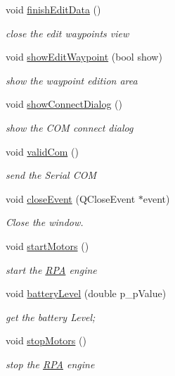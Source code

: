 \begin{DoxyCompactItemize}
void \hyperlink{class_m_a_r_c_s_afac390567e59b6ffb1a85ed8d10eb72d}{finish\-Edit\-Data} ()
\begin{DoxyCompactList}\small\item\em close the edit waypoints view \end{DoxyCompactList}\item 
void \hyperlink{class_m_a_r_c_s_af9305eb01a0389368c2a5c2ad58364ba}{show\-Edit\-Waypoint} (bool show)
\begin{DoxyCompactList}\small\item\em show the waypoint edition area \end{DoxyCompactList}\item 
void \hyperlink{class_m_a_r_c_s_a1daa288fdd9aac7708a6f19b284a1661}{show\-Connect\-Dialog} ()
\begin{DoxyCompactList}\small\item\em show the C\-O\-M connect dialog \end{DoxyCompactList}\item 
void \hyperlink{class_m_a_r_c_s_a1e9457e3289012e44b5bddf70f743468}{valid\-Com} ()
\begin{DoxyCompactList}\small\item\em send the Serial C\-O\-M \end{DoxyCompactList}\item 
void \hyperlink{class_m_a_r_c_s_aa5eb4375679c4532a015c9a067b0ab52}{close\-Event} (Q\-Close\-Event $\ast$event)
\begin{DoxyCompactList}\small\item\em Close the window. \end{DoxyCompactList}\item 
void \hyperlink{class_m_a_r_c_s_afefb7441273180bd38b7cf099a29b7da}{start\-Motors} ()
\begin{DoxyCompactList}\small\item\em start the \hyperlink{class_r_p_a}{R\-P\-A} engine \end{DoxyCompactList}\item 
void \hyperlink{class_m_a_r_c_s_ae868565ddb2f8652d3867cf54b13376e}{battery\-Level} (double p\-\_\-p\-Value)
\begin{DoxyCompactList}\small\item\em get the battery Level; \end{DoxyCompactList}\item 
void \hyperlink{class_m_a_r_c_s_adc9f59fc8d93d1e313e08547f80ce6a6}{stop\-Motors} ()
\begin{DoxyCompactList}\small\item\em stop the \hyperlink{class_r_p_a}{R\-P\-A} engine \end{DoxyCompactList}\item 

\end{DoxyCompactItemize}
